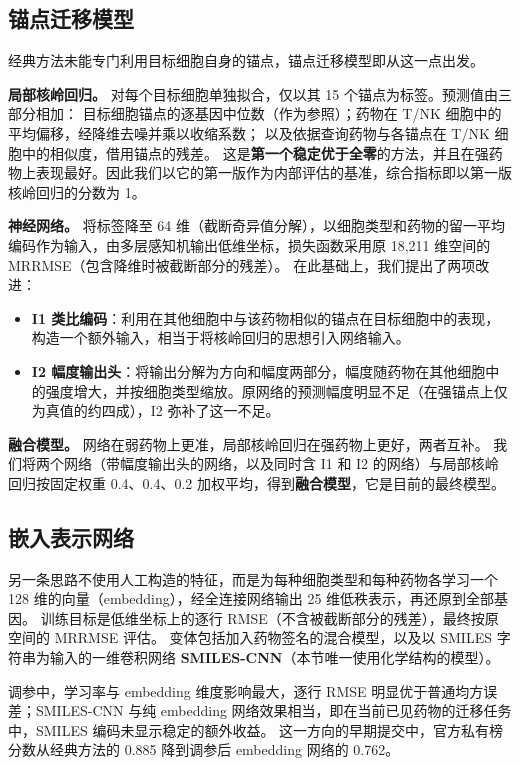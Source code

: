 \documentclass[11pt,a4paper]{article}
\begin{document}
\subsection{锚点迁移模型}
经典方法未能专门利用目标细胞自身的锚点，锚点迁移模型即从这一点出发。

\textbf{局部核岭回归。} 对每个目标细胞单独拟合，仅以其 15 个锚点为标签。预测值由三部分相加：
目标细胞锚点的逐基因中位数（作为参照）；药物在 T/NK 细胞中的平均偏移，经降维去噪并乘以收缩系数；
以及依据查询药物与各锚点在 T/NK 细胞中的相似度，借用锚点的残差。
这是\textbf{第一个稳定优于全零}的方法，并且在强药物上表现最好。因此我们以它的第一版作为内部评估的基准，综合指标即以第一版核岭回归的分数为 1。

\textbf{神经网络。} 将标签降至 64 维（截断奇异值分解），以细胞类型和药物的留一平均编码作为输入，由多层感知机输出低维坐标，损失函数采用原 18{,}211 维空间的 MRRMSE（包含降维时被截断部分的残差）。
在此基础上，我们提出了两项改进：
\begin{itemize}
\item \textbf{I1 类比编码}：利用在其他细胞中与该药物相似的锚点在目标细胞中的表现，构造一个额外输入，相当于将核岭回归的思想引入网络输入。
\item \textbf{I2 幅度输出头}：将输出分解为方向和幅度两部分，幅度随药物在其他细胞中的强度增大，并按细胞类型缩放。原网络的预测幅度明显不足（在强锚点上仅为真值的约四成），I2 弥补了这一不足。
\end{itemize}
\textbf{融合模型。} 网络在弱药物上更准，局部核岭回归在强药物上更好，两者互补。
我们将两个网络（带幅度输出头的网络，以及同时含 I1 和 I2 的网络）与局部核岭回归按固定权重 0.4、0.4、0.2 加权平均，得到\textbf{融合模型}，它是目前的最终模型。

\subsection{嵌入表示网络}
另一条思路不使用人工构造的特征，而是为每种细胞类型和每种药物各学习一个 128 维的向量（embedding），经全连接网络输出 25 维低秩表示，再还原到全部基因。
训练目标是低维坐标上的逐行 RMSE（不含被截断部分的残差），最终按原空间的 MRRMSE 评估。
变体包括加入药物签名的混合模型，以及以 SMILES 字符串为输入的一维卷积网络 \textbf{SMILES-CNN}（本节唯一使用化学结构的模型）。

调参中，学习率与 embedding 维度影响最大，逐行 RMSE 明显优于普通均方误差；SMILES-CNN 与纯 embedding 网络效果相当，即在当前已见药物的迁移任务中，SMILES 编码未显示稳定的额外收益。
这一方向的早期提交中，官方私有榜分数从经典方法的 0.885 降到调参后 embedding 网络的 0.762。
\end{document}
